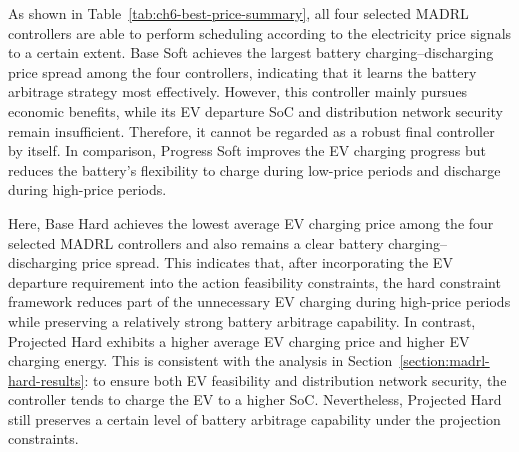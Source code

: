 As shown in Table~\ref{tab:ch6-best-price-summary}, all four selected MADRL controllers are able to perform scheduling according to the electricity price signals to a certain extent. Base Soft achieves the largest battery charging--discharging price spread among the four controllers, indicating that it learns the battery arbitrage strategy most effectively. However, this controller mainly pursues economic benefits, while its EV departure SoC and distribution network security remain insufficient. Therefore, it cannot be regarded as a robust final controller by itself. In comparison, Progress Soft improves the EV charging progress but reduces the battery's flexibility to charge during low-price periods and discharge during high-price periods.

\begin{table}[htbp]
  \centering
  \caption{Average EV and Battery Charging/Discharging Prices among EV Hard Constraint Controllers over the 15-Day Evaluation Period}
  \label{tab:ch6-best-price-summary}
\end{table}

Here, Base Hard achieves the lowest average EV charging price among the four selected MADRL controllers and also remains a clear battery charging--discharging price spread. This indicates that, after incorporating the EV departure requirement into the action feasibility constraints, the hard constraint framework reduces part of the unnecessary EV charging during high-price periods while preserving a relatively strong battery arbitrage capability. In contrast, Projected Hard exhibits a higher average EV charging price and higher EV charging energy. This is consistent with the analysis in Section~\ref{section:madrl-hard-results}: to ensure both EV feasibility and distribution network security, the controller tends to charge the EV to a higher SoC. Nevertheless, Projected Hard still preserves a certain level of battery arbitrage capability under the projection constraints.

